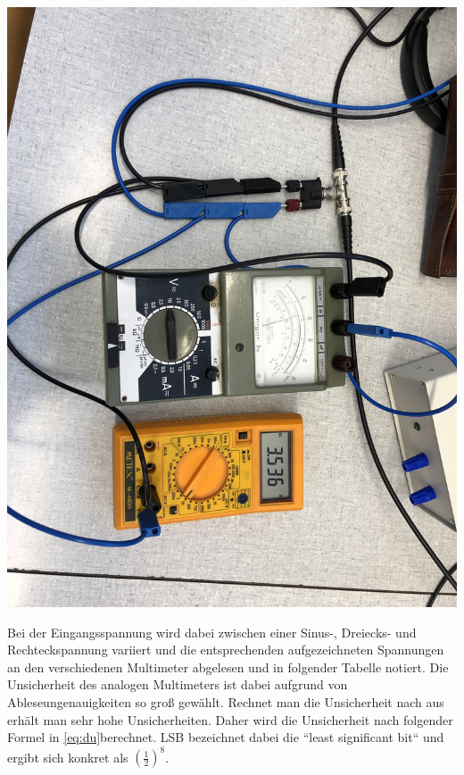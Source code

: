\documentclass[11pt,ngerman]{scrartcl}
\begin{document}
\begin{center}
	\begin{minipage}[t]{0.7\textwidth}
		\includegraphics[width=\textwidth]{aufbau1}
		\label{fig:aufbau1}
	\end{minipage}
\end{center}

Bei der Eingangsspannung wird dabei zwischen einer Sinus-, Dreiecks- und
Rechteckspannung variiert und die entsprechenden aufgezeichneten Spannungen an
den verschiedenen Multimeter abgelesen und in folgender Tabelle notiert. Die
Unsicherheit des analogen Multimeters ist dabei aufgrund von
Ableseungenauigkeiten so groß gewählt.  Rechnet man die Unsicherheit nach
\cite{uncertaintyoszi} aus erhält man sehr hohe Unsicherheiten. Daher wird die Unsicherheit
nach folgender Formel in \autoref{eq:du}berechnet.  LSB bezeichnet dabei die
``least significant bit`` und ergibt sich konkret als $(\frac{1}{2})^8$.
\end{document}

